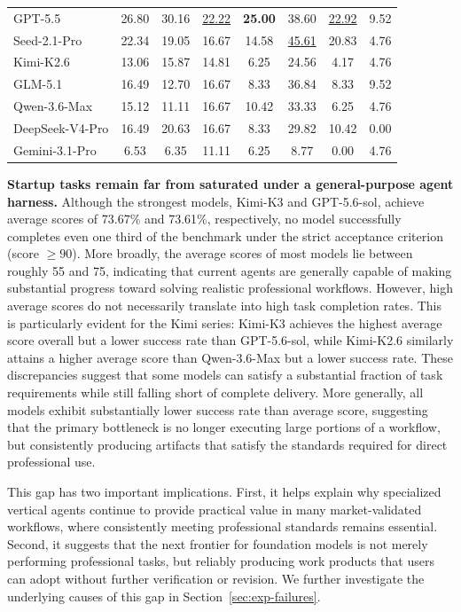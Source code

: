\begin{table}[t]
\begin{tabular}{lccccccc}
    GPT-5.5         & 26.80 & 30.16 & \underline{22.22} & \textbf{25.00} & 38.60 & \underline{22.92} & 9.52 \\
    Seed-2.1-Pro    & 22.34 & 19.05 & 16.67 & 14.58 & \underline{45.61} & 20.83 & 4.76 \\
    Kimi-K2.6       & 13.06 & 15.87 & 14.81 & 6.25 & 24.56 & 4.17 & 4.76 \\
    GLM-5.1         & 16.49 & 12.70 & 16.67 & 8.33 & 36.84 & 8.33 & 9.52 \\
    Qwen-3.6-Max    & 15.12 & 11.11 & 16.67 & 10.42 & 33.33 & 6.25 & 4.76 \\
    DeepSeek-V4-Pro & 16.49 & 20.63 & 16.67 & 8.33 & 29.82 & 10.42 & 0.00 \\
    Gemini-3.1-Pro  & 6.53 & 6.35 & 11.11 & 6.25 & 8.77 & 0.00 & 4.76 \\
    \bottomrule
  \end{tabular}
\end{table}

\textbf{Startup tasks remain far from saturated under a general-purpose agent harness.} Although the strongest models, Kimi-K3 and GPT-5.6-sol, achieve average scores of 73.67\% and 73.61\%, respectively, no model successfully completes even one third of the benchmark under the strict acceptance criterion (score $\ge 90$). More broadly, the average scores of most models lie between roughly 55 and 75, indicating that current agents are generally capable of making substantial progress toward solving realistic professional workflows. However, high average scores do not necessarily translate into high task completion rates. This is particularly evident for the Kimi series: Kimi-K3 achieves the highest average score overall but a lower success rate than GPT-5.6-sol, while Kimi-K2.6 similarly attains a higher average score than Qwen-3.6-Max but a lower success rate. These discrepancies suggest that some models can satisfy a substantial fraction of task requirements while still falling short of complete delivery. More generally, all models exhibit substantially lower success rate than average score, suggesting that the primary bottleneck is no longer executing large portions of a workflow, but consistently producing artifacts that satisfy the standards required for direct professional use.

This gap has two important implications. First, it helps explain why specialized vertical agents continue to provide practical value in many market-validated workflows, where consistently meeting professional standards remains essential. Second, it suggests that the next frontier for foundation models is not merely performing professional tasks, but reliably producing work products that users can adopt without further verification or revision. We further investigate the underlying causes of this gap in Section~\ref{sec:exp-failures}.


